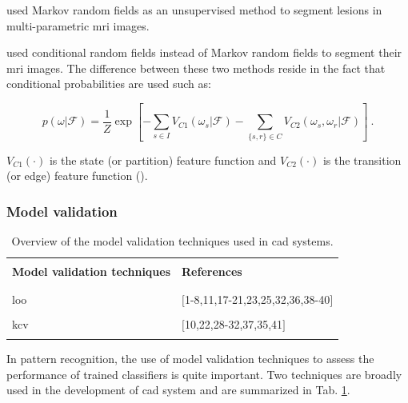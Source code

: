 \begin{enumerate}[leftmargin=*]
\cite{Liu2009,Ozer2010} used Markov random fields as an unsupervised method to segment lesions in multi-parametric \ac{mri} images.

\cite{Artan2009,Artan2010} used conditional random fields instead of Markov random fields to segment their \ac{mri} images. The difference between these two methods reside in the fact that conditional probabilities are used such as:

\begin{equation}
	p(\omega|\mathcal{F}) =  \frac{1}{Z} \exp \left[ - \sum_{s \in I} V_{C1}(\omega_s|\mathcal{F}) - \sum_{\{s,r\} \in C } V_{C2} (\omega_s,\omega_r|\mathcal{F})  \right] \ .
\label{eq:crf}
\end{equation}

\noindent $V_{C1}(\cdot)$ is the state (or partition) feature function and $V_{C2}(\cdot)$ is the transition (or edge) feature function (\cite{Kato2012}).

\end{enumerate}

\subsubsection{Model validation}

\begin{table}
	\caption{Overview of the model validation techniques used in \ac{cad} systems.}
	\small
	\begin{tabular}{p{.55\linewidth} p{.35\linewidth}}
		\hline \\ [-1.5ex]
		\textbf{Model validation techniques} & \textbf{References} \\ \\ [-1.5ex]
		\hline \\ [-1.5ex]
		\quad \acs{loo} & $[$1-8,11,17-21,23,25,32,36,38-40$]$ \\ \\ [-1.5ex]
		\quad \acs{kcv} & $[$10,22,28-32,37,35,41$]$ \\ \\ [-1.5ex]
		\hline
	\end{tabular}
	\label{tab:valmod}
\end{table}

In pattern recognition, the use of model validation techniques to assess the performance of trained classifiers is quite important. Two techniques are broadly used in the development of \ac{cad} system and are summarized in Tab. \ref{tab:valmod}.


